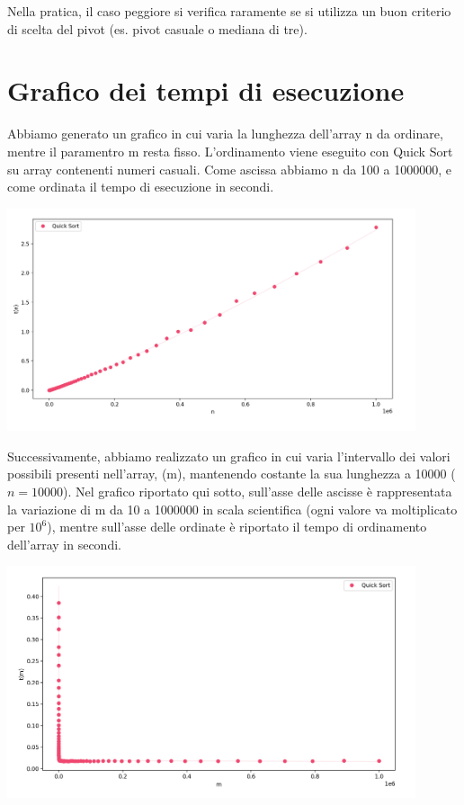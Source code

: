 \documentclass[a4paper, 12pt, oneside]{book}
\begin{document}
\noindent Nella pratica, il caso peggiore si verifica raramente se si utilizza un buon criterio di scelta del pivot (es. pivot casuale o mediana di tre).

\section{Grafico dei tempi di esecuzione}

Abbiamo generato un grafico in cui varia la lunghezza dell'array n da ordinare, mentre il paramentro m resta fisso. L'ordinamento viene eseguito con Quick Sort su array contenenti numeri casuali. Come ascissa abbiamo n da 100 a 1000000, e come ordinata il tempo di esecuzione in secondi.

\begin{center}
	\includegraphics[width=0.9\textwidth]{images/grafico_quick_sort_n.png}
\end{center}

\noindent Successivamente, abbiamo realizzato un grafico in cui varia l'intervallo dei valori possibili presenti nell'array, (m), mantenendo costante la sua lunghezza a 10000 (\(n=10000\)). Nel grafico riportato qui sotto, sull'asse delle ascisse è rappresentata la variazione di m da 10 a 1000000 in scala scientifica (ogni valore va moltiplicato per \(10^6\)), mentre sull'asse delle ordinate è riportato il tempo di ordinamento dell'array in secondi.
 
\begin{center}
	\includegraphics[width=0.9\textwidth]{images/grafico_quick_sort_m.png}
\end{center}
\end{document}
